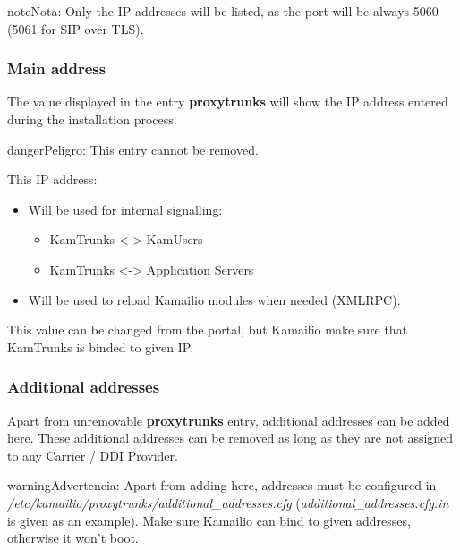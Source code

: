 \documentclass[letterpaper,10pt,spanish]{sphinxmanual}
\begin{document}
\begin{notice}{note}{Nota:}
Only the IP addresses will be listed, as the port will be always 5060
(5061 for SIP over TLS).
\end{notice}


\subsubsection{Main address}
\label{administration_portal/platform/infrastructure/proxy_trunks:main-address}
The value displayed in the entry \textbf{proxytrunks} will show the IP address
entered during the installation process.

\begin{notice}{danger}{Peligro:}
This entry cannot be removed.
\end{notice}

This IP address:
\begin{itemize}
\item {} 
Will be used for internal signalling:
\begin{itemize}
\item {} 
KamTrunks \textless{}-\textgreater{} KamUsers

\item {} 
KamTrunks \textless{}-\textgreater{} Application Servers

\end{itemize}

\item {} 
Will be used to reload Kamailio modules when needed (XMLRPC).

\end{itemize}

This value can be changed from the portal, but Kamailio make sure that KamTrunks is binded to given IP.


\subsubsection{Additional addresses}
\label{administration_portal/platform/infrastructure/proxy_trunks:additional-addresses}
Apart from unremovable \textbf{proxytrunks} entry, additional addresses can be added here. These additional addresses can be
removed as long as they are not assigned to any Carrier / DDI Provider.

\begin{notice}{warning}{Advertencia:}
Apart from adding here, addresses must be configured in \emph{/etc/kamailio/proxytrunks/additional\_addresses.cfg}
(\emph{additional\_addresses.cfg.in} is given as an example). Make sure Kamailio can bind to given addresses,
otherwise it won't boot.
\end{notice}
\end{document}
